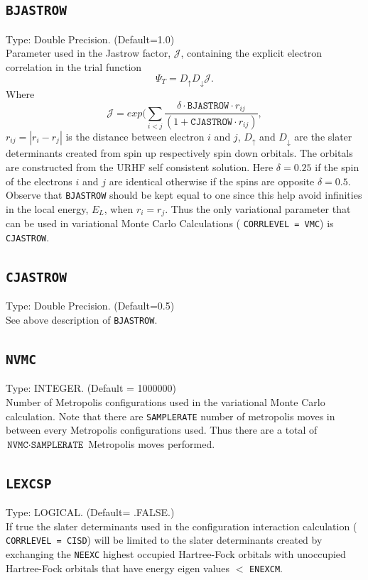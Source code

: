 \documentclass[a4paper,twoside,openany]{book}
\begin{document}
{{\subsection{\texttt{BJASTROW}}
Type: Double Precision. (Default=1.0)\\
Parameter used in the Jastrow factor, $\mathcal{J}$, containing the explicit electron correlation in the trial function
\begin{equation}
\Psi_{T} = D_{\uparrow}D_{\downarrow}\mathcal{J}.
\end{equation}
Where 
\begin{equation}
\mathcal{J} = exp(\sum_{i<j}\frac{\delta\cdot\texttt{BJASTROW}\cdot r_{ij}}{(1+ \texttt{CJASTROW}\cdot r_{ij})},
\end{equation}
$r_{ij} = | r_{i} - r_{j}|$ is the distance between electron $i$ and $j$, $D_{\uparrow}$ and $D_{\downarrow}$ are the slater determinants created from spin up respectively 
spin down orbitals. The orbitals are constructed from the URHF self consistent solution. Here $\delta = 0.25$ if the spin of the electrons $i$ and $j$ are identical otherwise 
if the spins are opposite $\delta = 0.5$. Observe that \texttt{BJASTROW} should be kept equal to one since this help avoid infinities in the local energy, $E_{L}$, when 
$r_{i}=r_{j}$. Thus the only variational parameter that can be used in variational Monte Carlo Calculations (  \texttt{CORRLEVEL = VMC}) is \texttt{CJASTROW}.

\subsection{\texttt{CJASTROW}}
Type: Double Precision. (Default=0.5)\\
See above description of \texttt{BJASTROW}.

\subsection{\texttt{NVMC}}
Type: INTEGER. (Default = 1000000)\\
Number of Metropolis configurations used in the variational Monte Carlo calculation. Note that there are \texttt{SAMPLERATE} number of metropolis moves in between 
every Metropolis configurations used. Thus there are a total of $\texttt{NVMC}\cdot \texttt{SAMPLERATE}$ Metropolis moves performed.

\subsection{\texttt{LEXCSP}}
Type:  LOGICAL. (Default= .FALSE.)\\
If true the slater determinants used in the configuration interaction calculation (  \texttt{CORRLEVEL  = CISD}) will be limited to the slater determinants created by exchanging the \texttt{NEEXC} highest 
occupied Hartree-Fock orbitals with unoccupied Hartree-Fock orbitals that have energy eigen values $<$ \texttt{ENEXCM}.

}}
\end{document}
